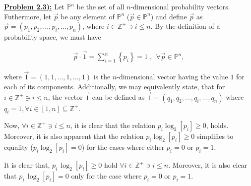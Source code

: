\documentclass{article}[12pt]
\numberwithin{equation}{subsection}
\newcommand{\prob}[1]{\textbf{\underline{Problem #1):}}}
\begin{document}
\begin{flushleft}



\prob{2.3}  Let $\mathbb{P}^n$ be the set of all $n$-dimensional probability vectors.  Futhermore, let $\vec{p}$ be any element of $\mathbb{P}^n$ ($\vec{p} \in \mathbb{P}^n$) and define $\vec{p}$ as $\vec{p} = \left( p_1, p_2, \dots, p_i, \dots, p_n \right)$, where $i \in \mathbb{Z}^+ \ni i \leq n$.  By the definition of a probability space, we must have

\begin{align*}
\vec{p} \cdot \vec{1} = \sum_{i=1}^n \left\{ p_i \right\} = 1  \; , \; \, \forall \vec{p} \in \mathbb{P}^n,
\end{align*}

where $\vec{1} = \left( 1, 1, \dots, 1, \dots, 1 \right)$ is the $n$-dimensional vector having the value $1$ for each of its components.  Additionally, we may equivalently state, that for $i \in \mathbb{Z}^+ \ni i \leq n$, the vector $\vec{1}$ can be defined as $\vec{1} = \left( q_1, q_2, \dots, q_i, \dots, q_n \right)$ where $q_i = 1, \forall i \in [1, n] \subseteq \mathbb{Z}^+$. \newline

Now, $\forall i \in \mathbb{Z}^+ \ni i \leq n$, it is clear that the relation $p_i \log_2 \left[ p_i \right] \geq 0$, holds.  Moreover, it is also apparent that the relation $p_i \log_2 \left[ p_i \right] \geq 0$ simplifies to equality ($p_i \log_2 \left[ p_i \right] = 0$) for the cases where either $p_i = 0$ or $p_i = 1$. \newline


It is clear that, $p_i \, \log_2 \left[ p_i \right] \geq 0$ hold $\forall i \in \mathbb{Z}^+ \ni i \leq n$.  Moreover, it is also clear that $p_i \, \log_2 \left[ p_i \right] = 0$ only for the case where $p_i = 0$ or $p_i = 1$.











\end{flushleft}
\end{document}
